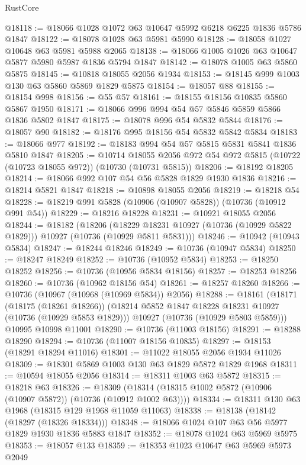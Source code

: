 \begin{lexlean}{RustCore}
\begin{coremodule}
@18118 := @18066 @1028 @1072 @63 @10647 @5992 @6218 @6225 @1836 @5786 @1847
@18122 := @18078 @1028 @63 @5981 @5990
@18128 := @18058 @1027 @10648 @63 @5981 @5988 @2065
@18138 := @18066 @1005 @1026 @63 @10647 @5877 @5980 @5987 @1836 @5794 @1847
@18142 := @18078 @1005 @63 @5860 @5875
@18145 := @10818 @18055 @2056 @1934
@18153 := @18145 @999 @1003 @130 @63 @5860 @5869 @1829 @5875
@18154 := @18057 @88
@18155 := @18154 @998
@18156 := @55 @57
@18161 := @18155 @18156 @10835 @5860 @5867 @1950
@18171 := @18066 @996 @994 @54 @57 @5846 @5859 @5866 @1836 @5802 @1847
@18175 := @18078 @996 @54 @5832 @5844
@18176 := @18057 @90
@18182 := @18176 @995 @18156 @54 @5832 @5842 @5834
@18183 := @18066 @977
@18192 := @18183 @994 @54 @57 @5815 @5831 @5841 @1836 @5810 @1847
@18205 := @10714
    @18055
    @2056
    @972
    @54
    @972
    @5815
    (@10722 (@10723 @18055 @972))
    (@10730 (@10731 @5815))
@18206 := @18192 @18205
@18214 := @18066 @992 @107 @54 @56 @5828 @1829 @1930 @1836
@18216 := @18214 @5821 @1847
@18218 := @10898 @18055 @2056
@18219 := @18218 @54
@18228 := @18219 @991 @5828 (@10906 (@10907 @5828)) (@10736 (@10912 @991 @54))
@18229 := @18216 @18228
@18231 := @10921 @18055 @2056
@18244 := @18182
    (@18206
      (@18229 @18231 @10927 (@10736 (@10929 @5822 @1829)))
      @10927
      (@10736 (@10929 @5811 @5831)))
@18246 := @10942 (@10943 @5834)
@18247 := @18244 @18246
@18249 := @10736 (@10947 @5834)
@18250 := @18247 @18249
@18252 := @10736 (@10952 @5834)
@18253 := @18250 @18252
@18256 := @10736 (@10956 @5834 @18156)
@18257 := @18253 @18256
@18260 := @10736 (@10962 @18156 @54)
@18261 := @18257 @18260
@18266 := @10736 (@10967 (@10968 (@10969 @5834)) @2056)
@18288 := @18161
    (@18171
      (@18175 (@18261 @18266))
      (@18214 @5852 @1847 @18228 @18231 @10927 (@10736 (@10929 @5853 @1829)))
      @10927
      (@10736 (@10929 @5803 @5859)))
    @10995
    @10998
    @11001
@18290 := @10736 (@11003 @18156)
@18291 := @18288 @18290
@18294 := @10736 (@11007 @18156 @10835)
@18297 := @18153 (@18291 @18294 @11016)
@18301 := @11022 @18055 @2056 @1934 @11026
@18309 := @18301 @5869 @1003 @130 @63 @1829 @5872 @1829 @1968
@18311 := @10594 @18055 @2056
@18314 := @18311 @1003 @63 @5872
@18315 := @18218 @63
@18326 := @18309 (@18314 (@18315 @1002 @5872 (@10906 (@10907 @5872)) (@10736 (@10912 @1002 @63))))
@18334 := @18311 @130 @63 @1968 (@18315 @129 @1968 @11059 @11063)
@18338 := @18138 (@18142 (@18297 (@18326 @18334)))
@18348 := @18066 @1024 @107 @63 @56 @5977 @1829 @1930 @1836 @5883 @1847
@18352 := @18078 @1024 @63 @5969 @5975
@18353 := @18057 @133
@18359 := @18353 @1023 @10647 @63 @5969 @5973 @2049

\end{coremodule}
\end{lexlean}
